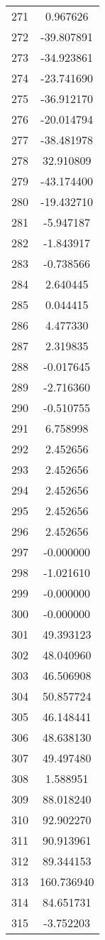 \documentclass[12pt]{article}
\begin{document}
\begin{longtable}{@{}cc@{}}
271 & 0.967626 \\
272 & -39.807891 \\
273 & -34.923861 \\
274 & -23.741690 \\
275 & -36.912170 \\
276 & -20.014794 \\
277 & -38.481978 \\
278 & 32.910809 \\
279 & -43.174400 \\
280 & -19.432710 \\
281 & -5.947187 \\
282 & -1.843917 \\
283 & -0.738566 \\
284 & 2.640445 \\
285 & 0.044415 \\
286 & 4.477330 \\
287 & 2.319835 \\
288 & -0.017645 \\
289 & -2.716360 \\
290 & -0.510755 \\
291 & 6.758998 \\
292 & 2.452656 \\
293 & 2.452656 \\
294 & 2.452656 \\
295 & 2.452656 \\
296 & 2.452656 \\
297 & -0.000000 \\
298 & -1.021610 \\
299 & -0.000000 \\
300 & -0.000000 \\
301 & 49.393123 \\
302 & 48.040960 \\
303 & 46.506908 \\
304 & 50.857724 \\
305 & 46.148441 \\
306 & 48.638130 \\
307 & 49.497480 \\
308 & 1.588951 \\
309 & 88.018240 \\
310 & 92.902270 \\
311 & 90.913961 \\
312 & 89.344153 \\
313 & 160.736940 \\
314 & 84.651731 \\
315 & -3.752203 \\

\end{longtable}
\end{document}
